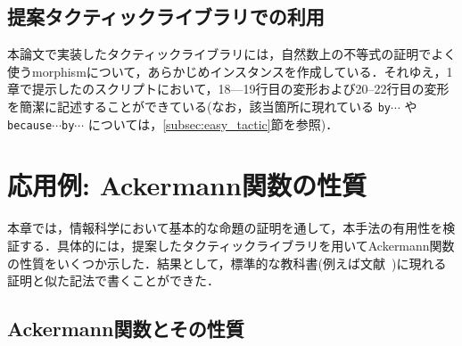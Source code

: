 \documentclass[submit]{ipsj}
\begin{document}
\subsection{提案タクティックライブラリでの利用}

本論文で実装したタクティックライブラリには，自然数上の不等式の証明でよく使うmorphismについて，あらかじめインスタンスを作成している．それゆえ，1章で提示したのスクリプトにおいて，18---19行目の変形および20--22行目の変形を簡潔に記述することができている(なお，該当箇所に現れている \verb+by+$\cdots$ や \verb+because+$\cdots$\verb+by+$\cdots$ については，\ref{subsec:easy_tactic}節を参照)．


\section{応用例: Ackermann関数の性質}

本章では，情報科学において基本的な命題の証明を通して，本手法の有用性を検証する．具体的には，提案したタクティックライブラリを用いてAckermann関数の性質をいくつか示した．結果として，標準的な教科書(例えば文献~\cite{1986オートマトンと計算可能性})に現れる証明と似た記法で書くことができた．

\subsection{Ackermann関数とその性質}
\end{document}
